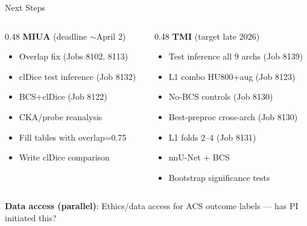 \documentclass[aspectratio=169,10pt]{beamer}
\begin{document}
\begin{frame}{Next Steps}

\begin{columns}[t]
\begin{column}{0.48\textwidth}
\textbf{MIUA} (deadline $\sim$April 2)
\begin{itemize}
    \footnotesize
    \item Overlap fix (Jobs 8102, 8113)
    \item clDice test inference (Job 8132)
    \item BCS+clDice (Job 8122)
    \item CKA/probe reanalysis
    \item Fill tables with overlap=0.75
    \item Write clDice comparison
\end{itemize}
\end{column}
\begin{column}{0.48\textwidth}
\textbf{TMI} (target late 2026)
\begin{itemize}
    \footnotesize
    \item Test inference all 9 archs (Job 8139)
    \item L1 combo HU800+aug (Job 8123)
    \item No-BCS controls (Job 8130)
    \item Best-preproc cross-arch (Job 8130)
    \item L1 folds 2--4 (Job 8131)
    \item nnU-Net + BCS
    \item Bootstrap significance tests
\end{itemize}
\end{column}
\end{columns}

\vspace{0.3cm}
\textbf{Data access (parallel)}: Ethics/data access for ACS outcome labels --- has PI initiated this?

\end{frame}
\end{document}
